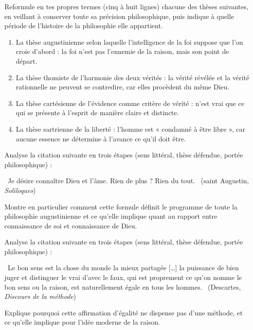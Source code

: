 \documentclass[11pt]{article}
\newcommand{\cle}[1]{{\popxbold\color{popdark}#1}}
\newcounter{popsec}
\newcounter{popsub}
\newcommand{\courssub}[1]{%
  \stepcounter{popsub}%
  \par\vspace{9pt}\noindent{\popxbold\fontsize{11.5}{13}\selectfont\color{popink}{\color{poporange}\thepopsec.\thepopsub}\hspace{6pt}#1}\par\nopagebreak\vspace{4pt}
}
\begin{document}
\courssub{Je m'entraîne}

\begin{exercice}
Reformule en tes propres termes (cinq à huit lignes) chacune des thèses suivantes, en veillant à conserver toute sa précision philosophique, puis indique à quelle période de l'histoire de la philosophie elle appartient.

\begin{enumerate}
\item La thèse augustinienne selon laquelle l'intelligence de la foi suppose que l'on croie d'abord : la foi n'est pas l'ennemie de la raison, mais son point de départ.
\item La thèse thomiste de l'harmonie des deux vérités : la vérité révélée et la vérité rationnelle ne peuvent se contredire, car elles procèdent du même Dieu.
\item La thèse cartésienne de l'évidence comme critère de vérité : n'est vrai que ce qui se présente à l'esprit de manière claire et distincte.
\item La thèse sartrienne de la liberté : l'homme est « condamné à être libre », car aucune essence ne détermine à l'avance ce qu'il doit être.
\end{enumerate}
\end{exercice}

\begin{exercice}
Analyse la citation suivante en trois étapes (sens littéral, thèse défendue, portée philosophique) :

\guillemotleft\ Je désire connaître Dieu et l'âme. Rien de plus ? Rien du tout. \guillemotright\ (saint Augustin, \emph{Soliloques})

Montre en particulier comment cette formule définit le programme de toute la philosophie augustinienne et ce qu'elle implique quant au rapport entre connaissance de soi et connaissance de Dieu.
\end{exercice}

\begin{exercice}
Analyse la citation suivante en trois étapes (sens littéral, thèse défendue, portée philosophique) :

\guillemotleft\ Le bon sens est la chose du monde la mieux partagée [\ldots] la puissance de bien juger et distinguer le vrai d'avec le faux, qui est proprement ce qu'on nomme le bon sens ou la raison, est naturellement égale en tous les hommes. \guillemotright\ (Descartes, \emph{Discours de la méthode})

Explique pourquoi cette affirmation d'égalité ne dispense pas d'une \cle{méthode}, et ce qu'elle implique pour l'idée moderne de la raison.
\end{exercice}
\end{document}
